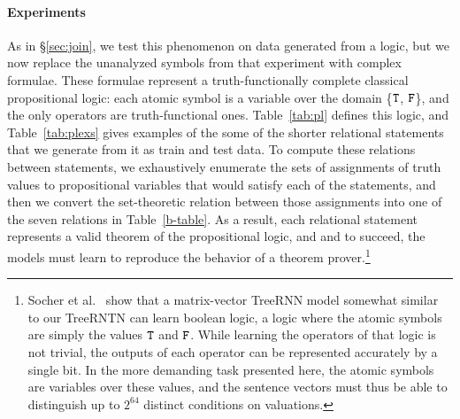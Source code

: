 \paragraph{Experiments}
As in \S\ref{sec:join}, we test this phenomenon on data generated from a logic,
 but we now replace the unanalyzed symbols
from that experiment with complex formulae. These formulae
represent a truth-functionally complete classical propositional logic:
each atomic symbol is a variable over the domain \{$\texttt{T}$, $\texttt{F}$\}, and the only
operators are truth-functional ones.  Table~\ref{tab:pl} defines this
logic, and Table~\ref{tab:plexs} gives examples of the some of the shorter relational
statements that we generate from it as train and test data. To compute these relations
between statements, we exhaustively enumerate the sets of assignments
of truth values to propositional variables that would satisfy each of
the statements, and then we convert the set-theoretic relation between
those assignments into one of the seven relations in
Table~\ref{b-table}. As a result, each relational statement represents
a valid theorem of the propositional logic, and and to succeed, the models 
must learn to reproduce the behavior of a theorem prover.\footnote{
Socher et al.~ show that a matrix-vector TreeRNN
model somewhat similar to our TreeRNTN can learn boolean logic, 
a logic where the atomic symbols are simply the
values $\texttt{T}$ and $\texttt{F}$. While learning the operators of that logic is not trivial, the outputs of
each operator can be represented accurately by a single bit.
In the more demanding task presented here, the atomic symbols are variables over these values, and the sentence vectors must thus be able to distinguish up to $2^{64}$ distinct conditions on valuations.}

